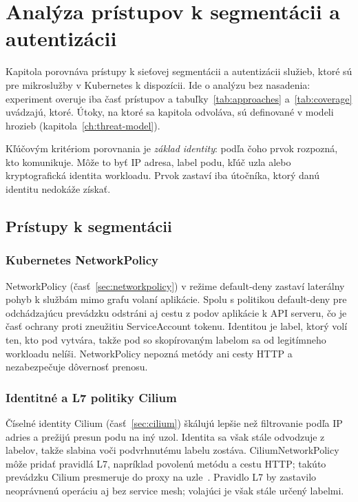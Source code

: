 \chapter{Analýza prístupov k segmentácii a autentizácii}
\label{ch:analysis}

Kapitola porovnáva prístupy k sieťovej segmentácii a autentizácii služieb, ktoré sú pre mikroslužby v Kubernetes k dispozícii. Ide o analýzu bez nasadenia: experiment overuje iba časť prístupov a tabuľky~\ref{tab:approaches} a~\ref{tab:coverage} uvádzajú, ktoré. Útoky, na ktoré sa kapitola odvoláva, sú definované v modeli hrozieb (kapitola~\ref{ch:threat-model}).

Kľúčovým kritériom porovnania je \emph{základ identity}: podľa čoho prvok rozpozná, kto komunikuje. Môže to byť IP adresa, label podu, kľúč uzla alebo kryptografická identita workloadu. Prvok zastaví iba útočníka, ktorý danú identitu nedokáže získať.

\section{Prístupy k segmentácii}
\label{sec:segmentation}

\subsection{Kubernetes NetworkPolicy}

NetworkPolicy (časť~\ref{sec:networkpolicy}) v režime default-deny zastaví laterálny pohyb k službám mimo grafu volaní aplikácie. Spolu s politikou default-deny pre odchádzajúcu prevádzku odstráni aj cestu z podov aplikácie k API serveru, čo je časť ochrany proti zneužitiu ServiceAccount tokenu. Identitou je label, ktorý volí ten, kto pod vytvára, takže pod so skopírovaným labelom sa od legitímneho workloadu nelíši. NetworkPolicy nepozná metódy ani cesty HTTP a nezabezpečuje dôvernosť prenosu.

\subsection{Identitné a L7 politiky Cilium}

Číselné identity Cilium (časť~\ref{sec:cilium}) škálujú lepšie než filtrovanie podľa IP adries a prežijú presun podu na iný uzol. Identita sa však stále odvodzuje z labelov, takže slabina voči podvrhnutému labelu zostáva. CiliumNetworkPolicy môže pridať pravidlá L7, napríklad povolenú metódu a cestu HTTP; takúto prevádzku Cilium presmeruje do proxy na uzle~\cite{cilium-policy}. Pravidlo L7 by zastavilo neoprávnenú operáciu aj bez service mesh; volajúci je však stále určený labelmi.

